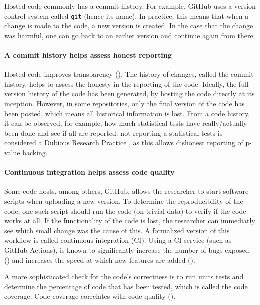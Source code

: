 Hosted code commonly has a commit history. For example, GitHub
uses a version control system called \verb|git| (hence its name).
In practice, this means that when a change is made to the code,
a new version is created. In the case that the change was harmful,
one can go back to an earlier version and continue again from there.

\paragraph{A commit history helps assess honest reporting}

Hosted code improves transparency (\cite{gorgolewski2016practical}).
The history of changes, called the commit history, 
helps to assess the honesty in the reporting of the code. 
Ideally, the full version history of the code 
has been generated, by hosting the code directly at its inception.
However, in some repositories, only the final version of the code has been
posted, which means all historical information is lost.
From a code history, it can be observed, for example, 
how much statistical tests have really/actually been done 
and see if all are reported:
not reporting a statistical tests is considered a Dubious Research Practice 
, as this allows dishonest reporting of p-value hacking.

\paragraph{Continuous integration helps assess code quality}

Some code hosts, among others, GitHub, 
allows the researcher to start software scripts when uploading a new version.
To determine the reproducibility of the code, one such script should
run the code (on trivial data) to verify if the code works at all.
If the functionality of the code is lost, the researcher
can immediatly see which small change was the cause of this.
A formalized version of this workflow is called continuous integration (CI).
Using a CI service (such as GitHub Actions), is known to significantly 
increase the number of bugs exposed (\cite{vasilescu2015}) and increases
the speed at which new features are added (\cite{vasilescu2015}).

A more sophisticated check for the code's correctness is
to run units tests and determine the percentage of code that has been
tested, which is called the code coverage. Code coverage
correlates with code quality (\cite{horgan1994,del1995correlation}). 

